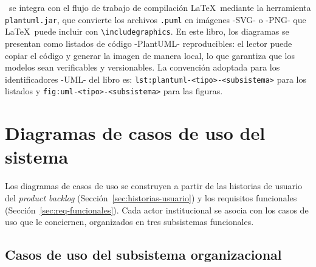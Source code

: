 \plantuml\ se integra con el flujo de trabajo de compilación \LaTeX\ mediante
la herramienta \texttt{plantuml.jar}, que convierte los archivos \texttt{.puml}
en imágenes -SVG- o -PNG- que \LaTeX\ puede incluir con \verb|\includegraphics|.
En este libro, los diagramas se presentan como listados de código -PlantUML-
reproducibles: el lector puede copiar el código y generar la imagen de manera
local, lo que garantiza que los modelos sean verificables y versionables.
La convención adoptada para los identificadores -UML- del libro es:
\texttt{lst:plantuml-<tipo>-<subsistema>} para los listados
y \texttt{fig:uml-<tipo>-<subsistema>} para las figuras.

\section{Diagramas de casos de uso del sistema}
\label{sec:casos-uso}

Los diagramas de casos de uso se construyen a partir de las historias de
usuario del \textit{product backlog} (Sección~\ref{sec:historias-usuario})
y los requisitos funcionales (Sección~\ref{sec:req-funcionales}). Cada
actor institucional se asocia con los casos de uso que le conciernen,
organizados en tres subsistemas funcionales.

\subsection{Casos de uso del subsistema organizacional}
\label{subsec:uc-organizacional}

